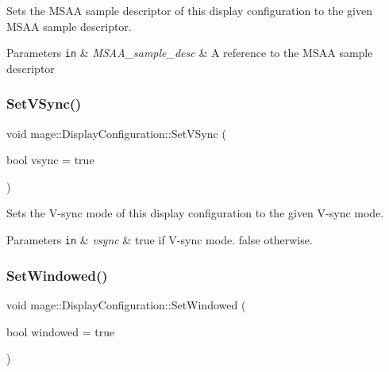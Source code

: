 Sets the M\+S\+AA sample descriptor of this display configuration to the given M\+S\+AA sample descriptor.


\begin{DoxyParams}[1]{Parameters}
\mbox{\tt in}  & {\em M\+S\+A\+A\+\_\+sample\+\_\+desc} & A reference to the M\+S\+AA sample descriptor \\
\hline
\end{DoxyParams}
\hypertarget{structmage_1_1_display_configuration_a7a14343be4f07dcdf4e8be66a118da29}{}\label{structmage_1_1_display_configuration_a7a14343be4f07dcdf4e8be66a118da29} 
\subsubsection{\texorpdfstring{Set\+V\+Sync()}{SetVSync()}}
{\footnotesize\ttfamily void mage\+::\+Display\+Configuration\+::\+Set\+V\+Sync (\begin{DoxyParamCaption}\item[{bool}]{vsync = {\ttfamily true} }\end{DoxyParamCaption})\hspace{0.3cm}{\ttfamily [noexcept]}}

Sets the V-\/sync mode of this display configuration to the given V-\/sync mode.


\begin{DoxyParams}[1]{Parameters}
\mbox{\tt in}  & {\em vsync} & {\ttfamily true} if V-\/sync mode. {\ttfamily false} otherwise. \\
\hline
\end{DoxyParams}
\hypertarget{structmage_1_1_display_configuration_ac6228139b3fae3b5fb454aa072b94efd}{}\label{structmage_1_1_display_configuration_ac6228139b3fae3b5fb454aa072b94efd} 
\subsubsection{\texorpdfstring{Set\+Windowed()}{SetWindowed()}}
{\footnotesize\ttfamily void mage\+::\+Display\+Configuration\+::\+Set\+Windowed (\begin{DoxyParamCaption}\item[{bool}]{windowed = {\ttfamily true} }\end{DoxyParamCaption})\hspace{0.3cm}{\ttfamily [noexcept]}}

